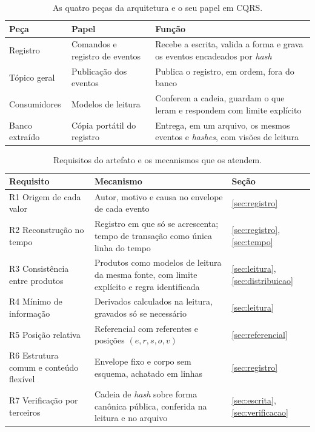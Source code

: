 \begin{table}[htbp]
    \centering
    \caption{As quatro peças da arquitetura e o seu papel em CQRS.}
    \label{tab:pecas}
    \begin{tabularx}{\linewidth}{l l X}
        \toprule
        Peça & Papel & Função \\
        \midrule
        Registro & Comandos e registro de eventos & Recebe a escrita, valida a forma e grava os eventos encadeados por \textit{hash} \\
        Tópico geral & Publicação dos eventos & Publica o registro, em ordem, fora do banco \\
        Consumidores & Modelos de leitura & Conferem a cadeia, guardam o que leram e respondem com limite explícito \\
        Banco extraído & Cópia portátil do registro & Entrega, em um arquivo, os mesmos eventos e \textit{hashes}, com visões de leitura \\
        \bottomrule
    \end{tabularx}
    \par{}
\end{table}

\begin{table}[htbp]
    \centering
    \caption{Requisitos do artefato e os mecanismos que os atendem.}
    \label{tab:requisitos-mecanismos}
    \begin{tabularx}{\linewidth}{l X l}
        \toprule
        Requisito & Mecanismo & Seção \\
        \midrule
        R1 Origem de cada valor & Autor, motivo e causa no envelope de cada evento & \ref{sec:registro} \\
        R2 Reconstrução no tempo & Registro em que só se acrescenta; tempo de transação como única linha do tempo & \ref{sec:registro}, \ref{sec:tempo} \\
        R3 Consistência entre produtos & Produtos como modelos de leitura da mesma fonte, com limite explícito e regra identificada & \ref{sec:leitura}, \ref{sec:distribuicao} \\
        R4 Mínimo de informação & Derivados calculados na leitura, gravados só se necessário& \ref{sec:leitura} \\
        R5 Posição relativa & Referencial com referentes e posições $(e, r, s, o, v)$ & \ref{sec:referencial} \\
        R6 Estrutura comum e conteúdo flexível & Envelope fixo e corpo sem esquema, achatado em linhas & \ref{sec:registro} \\
        R7 Verificação por terceiros & Cadeia de \textit{hash} sobre forma canônica pública, conferida na leitura e no arquivo & \ref{sec:escrita}, \ref{sec:verificacao} \\
        \bottomrule
    \end{tabularx}
    \par{}
\end{table}

